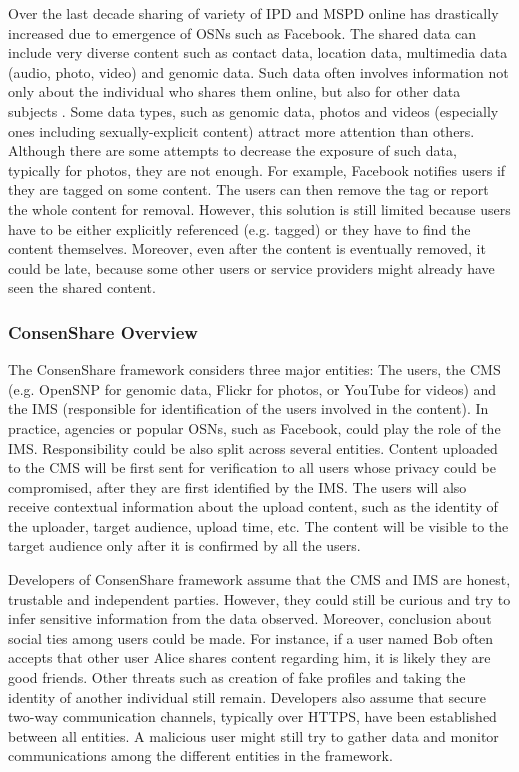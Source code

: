 \documentclass[conference]{IEEEtran}
\begin{document}
Over the last decade sharing of variety of \ac{IPD} and \ac{MSPD} online has drastically increased due to emergence of \ac{OSN}s such as Facebook. The shared data can include very diverse content such as contact data, location data, multimedia data (audio, photo, video) and genomic data. Such data often involves information not only about the individual who shares them online, but also for other data subjects \cite{ahern2007}. Some data types, such as genomic data, photos and videos (especially ones including sexually-explicit content) attract more attention than others. Although there are some attempts to decrease the exposure of such data, typically for photos, they are not enough. For example, Facebook notifies users if they are tagged on some content. The users can then remove the tag or report the whole content for removal. However, this solution is still limited because users have to be either explicitly referenced (e.g. tagged) or they have to find the content themselves. Moreover, even after the content is eventually removed, it could be late, because some other users or service providers might already have seen the shared content. 

\subsubsection{ConsenShare Overview}
The ConsenShare framework \cite{olteanu2018consensual} considers three major entities: The users, the \ac{CMS} (e.g. OpenSNP for genomic data, Flickr for photos, or YouTube for videos) and the \ac{IMS} (responsible for identification of the users involved in the content). In practice, agencies or popular OSNs, such as Facebook, could play the role of the \ac{IMS}. Responsibility could be also split across several entities. Content uploaded to the CMS will be first sent for verification to all users whose privacy could be compromised, after they are first identified by the \ac{IMS}. The users will also receive contextual information about the upload content, such as the identity of the uploader, target audience, upload time, etc. The content will be visible to the target audience only after it is confirmed by all the users. 

Developers of ConsenShare framework assume that the \ac{CMS} and \ac{IMS} are honest, trustable and independent parties. However, they could still be curious and try to infer sensitive information from the data observed. Moreover, conclusion about social ties among users could be made. For instance, if a user named Bob often accepts that other user Alice shares content regarding him, it is likely they are good friends. Other threats such as creation of fake profiles and taking the identity of another individual still remain. Developers also assume that secure two-way communication channels, typically over HTTPS, have been established between all entities. A malicious user might still try to gather data and monitor communications among the different entities in the framework. 
\end{document}
